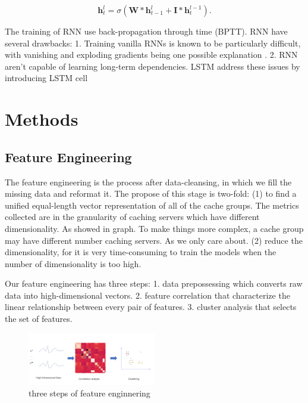 \documentclass[5p]{elsarticle}
\begin{document}
\begin{equation}
	\mathbf h_t^{l} = \sigma(\mathbf W * \mathbf h_{t-1}^{l} + \mathbf I * \mathbf h_t^{l-1}).
\end{equation}

The training of RNN use back-propagation through time (BPTT). RNN have several drawbacks: 1. Training vanilla RNNs is known to be particularly difficult, with vanishing and exploding gradients being one possible explanation \cite{Bengio1994LearningDifficult}. 2. RNN aren't capable of learning long-term dependencies. LSTM address these issues by introducing LSTM cell\cite{Hochreiter1997LongMemory} 


\section{Methods}
\subsection{Feature Engineering}
The feature engineering is the process after data-cleansing, in which we fill the missing data and reformat it. The propose of this stage is two-fold:
(1) to find a unified equal-length vector representation of all of the cache groups. 
The metrics collected are in the granularity of caching servers which have different dimensionality. As showed in graph. To make things more complex, a cache group may have different number caching servers. As we only care about. 
(2) reduce the dimensionality, for it is very time-consuming to train the models when the number of dimensionality is too high.

Our feature engineering has three steps: 1. data prepossessing which converts raw data into high-dimensional vectors. 2. feature correlation that characterize the linear relationship between every pair of features. 3. cluster analysis that selects the set of features.

\begin{figure}[h]
    \centering
    \includegraphics[width=0.5\textwidth]{feature_engineering.png}
    \caption{three steps of feature enginnering}
    \label{fig:Correlation_matrix}
\end{figure}
\end{document}
